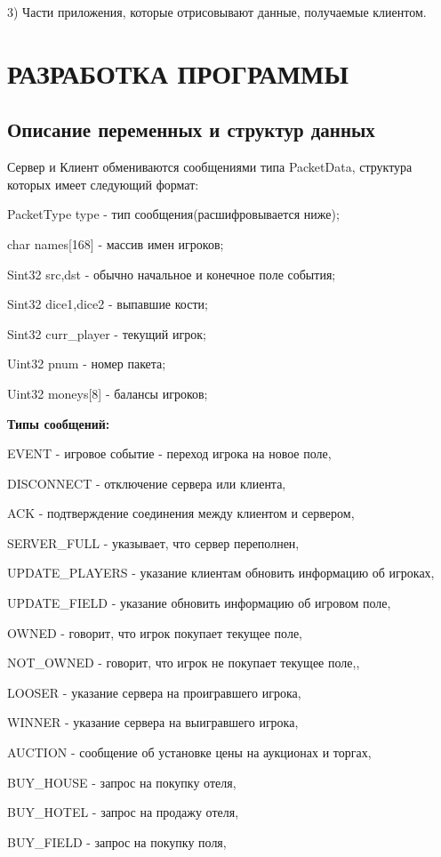 3) Части приложения, которые отрисовывают данные, получаемые клиентом.
\section{РАЗРАБОТКА ПРОГРАММЫ}
\subsection{Описание переменных и структур данных}
Сервер и Клиент обмениваются сообщениями типа PacketData, структура которых имеет следующий формат:
        
       PacketType type - тип сообщения(расшифровывается ниже);
        
       char names[168] - массив имен игроков;
        
       Sint32 src,dst - обычно начальное и конечное поле события;
        
       Sint32 dice1,dice2 - выпавшие кости;
        
       Sint32 curr\_player - текущий игрок;
        
       Uint32 pnum - номер пакета;
        
       Uint32 moneys[8] - балансы игроков;

{\bf Типы сообщений:}

EVENT - игровое событие - переход игрока на новое поле,

DISCONNECT - отключение сервера или клиента,

ACK - подтверждение  соединения между клиентом и сервером,

SERVER\_FULL - указывает, что сервер переполнен,

UPDATE\_PLAYERS - указание клиентам обновить информацию об игроках,

UPDATE\_FIELD - указание обновить информацию об игровом поле,

OWNED - говорит, что игрок покупает текущее поле,

NOT\_OWNED - говорит, что игрок не покупает текущее поле,,

LOOSER - указание сервера на проигравшего игрока,

WINNER - указание сервера на выигравшего игрока,

AUCTION - сообщение об установке цены на аукционах и торгах,

BUY\_HOUSE - запрос на покупку отеля,

BUY\_HOTEL - запрос на продажу отеля,

BUY\_FIELD - запрос на покупку поля,

